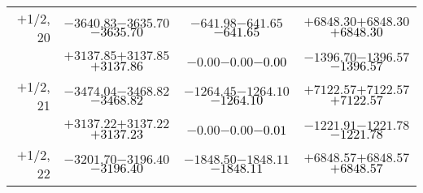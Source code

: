 \documentclass[compress]{beamer}
\begin{document}
\begin{frame}
{\begin{tabular}{r | c | c | c}
$+$1/2, 20 & $-3640.83$\hspace{0.1 cm}$-3635.70$\hspace{0.1 cm}\textcolor{black}{$-3635.70$} & $-641.98$\hspace{0.1 cm}$-641.65$\hspace{0.1 cm}\textcolor{black}{$-641.65$} & $+6848.30$\hspace{0.1 cm}$+6848.30$\hspace{0.1 cm}\textcolor{black}{$+6848.30$} \\
           & $+3137.85$\hspace{0.1 cm}$+3137.85$\hspace{0.1 cm}\textcolor{black}{$+3137.86$} & $-0.00$\hspace{0.1 cm}$-0.00$\hspace{0.1 cm}\textcolor{black}{$-0.00$} & $-1396.70$\hspace{0.1 cm}$-1396.57$\hspace{0.1 cm}\textcolor{black}{$-1396.57$} \\
$+$1/2, 21 & $-3474.04$\hspace{0.1 cm}$-3468.82$\hspace{0.1 cm}\textcolor{black}{$-3468.82$} & $-1264.45$\hspace{0.1 cm}$-1264.10$\hspace{0.1 cm}\textcolor{black}{$-1264.10$} & $+7122.57$\hspace{0.1 cm}$+7122.57$\hspace{0.1 cm}\textcolor{black}{$+7122.57$} \\
           & $+3137.22$\hspace{0.1 cm}$+3137.22$\hspace{0.1 cm}\textcolor{black}{$+3137.23$} & $-0.00$\hspace{0.1 cm}$-0.00$\hspace{0.1 cm}\textcolor{black}{$-0.01$} & $-1221.91$\hspace{0.1 cm}$-1221.78$\hspace{0.1 cm}\textcolor{black}{$-1221.78$} \\
$+$1/2, 22 & $-3201.70$\hspace{0.1 cm}$-3196.40$\hspace{0.1 cm}\textcolor{black}{$-3196.40$} & $-1848.50$\hspace{0.1 cm}$-1848.11$\hspace{0.1 cm}\textcolor{black}{$-1848.11$} & $+6848.57$\hspace{0.1 cm}$+6848.57$\hspace{0.1 cm}\textcolor{black}{$+6848.57$} \\

\end{tabular}}
\end{frame}
\end{document}
